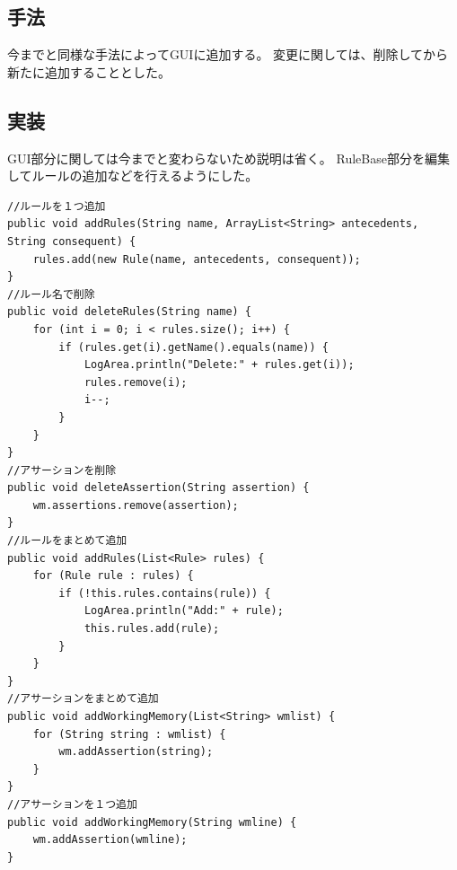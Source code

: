 \documentclass{jarticle}
\begin{document}
\subsection{手法}
今までと同様な手法によってGUIに追加する。
変更に関しては、削除してから新たに追加することとした。
\subsection{実装}
GUI部分に関しては今までと変わらないため説明は省く。
RuleBase部分を編集してルールの追加などを行えるようにした。
\begin{lstlisting}[caption=編集,label=src:Change]
//ルールを１つ追加
public void addRules(String name, ArrayList<String> antecedents, String consequent) {
	rules.add(new Rule(name, antecedents, consequent));
}
//ルール名で削除
public void deleteRules(String name) {
	for (int i = 0; i < rules.size(); i++) {
		if (rules.get(i).getName().equals(name)) {
			LogArea.println("Delete:" + rules.get(i));
			rules.remove(i);
			i--;
		}
	}
}
//アサーションを削除
public void deleteAssertion(String assertion) {
	wm.assertions.remove(assertion);
}
//ルールをまとめて追加
public void addRules(List<Rule> rules) {
	for (Rule rule : rules) {
		if (!this.rules.contains(rule)) {
			LogArea.println("Add:" + rule);
			this.rules.add(rule);
		}
	}
}
//アサーションをまとめて追加
public void addWorkingMemory(List<String> wmlist) {
	for (String string : wmlist) {
		wm.addAssertion(string);
	}
}
//アサーションを１つ追加
public void addWorkingMemory(String wmline) {
	wm.addAssertion(wmline);
}
\end{lstlisting}

\newpage
\end{document}
